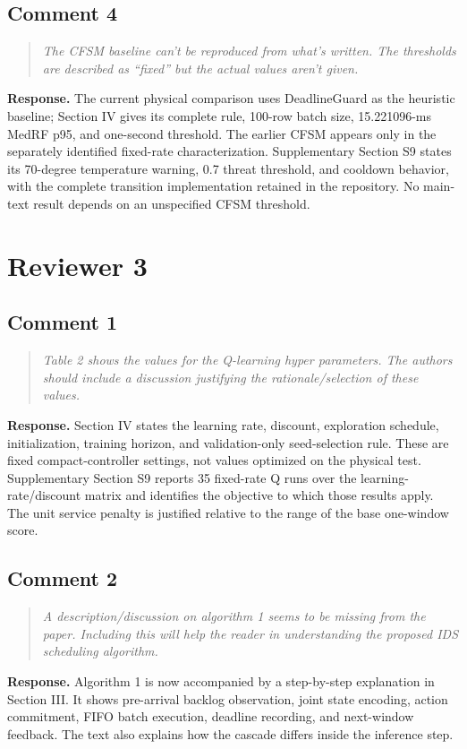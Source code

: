 \documentclass[11pt,a4paper]{article}
\newenvironment{comment}{\begin{quote}\small\itshape}{\end{quote}}
\newcommand{\response}{\noindent\textbf{Response.} }
\begin{document}
\subsection*{Comment 4}
\begin{comment}
The CFSM baseline can't be reproduced from what's written. The thresholds are described as ``fixed'' but the actual values aren't given.
\end{comment}
\response The current physical comparison uses DeadlineGuard as the heuristic baseline; Section IV gives its complete rule, 100-row batch size, 15.221096-ms MedRF p95, and one-second threshold. The earlier CFSM appears only in the separately identified fixed-rate characterization. Supplementary Section S9 states its 70-degree temperature warning, 0.7 threat threshold, and cooldown behavior, with the complete transition implementation retained in the repository. No main-text result depends on an unspecified CFSM threshold.

\section*{Reviewer 3}
\subsection*{Comment 1}
\begin{comment}
Table 2 shows the values for the Q-learning hyper parameters. The authors should include a discussion justifying the rationale/selection of these values.
\end{comment}
\response Section IV states the learning rate, discount, exploration schedule, initialization, training horizon, and validation-only seed-selection rule. These are fixed compact-controller settings, not values optimized on the physical test. Supplementary Section S9 reports 35 fixed-rate Q runs over the learning-rate/discount matrix and identifies the objective to which those results apply. The unit service penalty is justified relative to the range of the base one-window score.

\subsection*{Comment 2}
\begin{comment}
A description/discussion on algorithm 1 seems to be missing from the paper. Including this will help the reader in understanding the proposed IDS scheduling algorithm.
\end{comment}
\response Algorithm 1 is now accompanied by a step-by-step explanation in Section III. It shows pre-arrival backlog observation, joint state encoding, action commitment, FIFO batch execution, deadline recording, and next-window feedback. The text also explains how the cascade differs inside the inference step.
\end{document}
